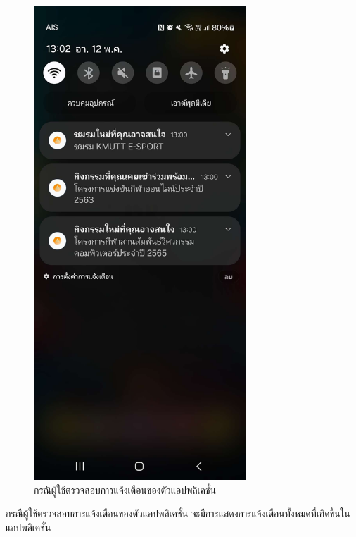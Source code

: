 \documentclass[14pt,oneside,openright,a4paper]{cpe-thai-project}
\begin{document}
\begin{figure}[!h]\centering
  \includegraphics[width=8cm]{./Pictures/NotificationPage.jpg}
  \caption{กรณีผู้ใช้ตรวจสอบการแจ้งเตือนของตัวแอปพลิเคชั่น}\label{fig:NotificationTest}
\end{figure}
  \hspace*{1cm} กรณีผู้ใช้ตรวจสอบการแจ้งเตือนของตัวแอปพลิเคชั่น จะมีการแสดงการแจ้งเตือนทั้งหมดที่เกิดขึ้นในแอปพลิเคชั่น
\end{document}
